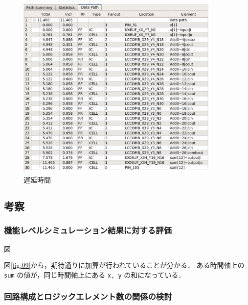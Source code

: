 \documentclass[uplatex]{jsarticle}
\begin{document}
\begin{figure}[htb]
  \begin{center}
    \includegraphics[width=10cm]{images/fig08.eps}
    \caption{遅延時間}
    \label{fig:08}
  \end{center}
\end{figure}

\subsection{考察}

\subsubsection{機能レベルシミュレーション結果に対する評価}

















図

図\ref{fig:09}から，期待通りに加算が行われていることが分かる．
ある時間軸上の {\tt sum} の値が，同じ時間軸上にある {\tt x, y} の和になっている．

\subsubsection{回路構成とロジックエレメント数の関係の検討}
\end{document}
